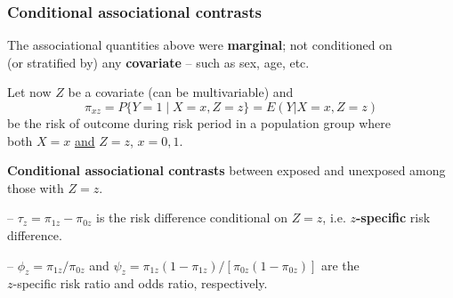\documentclass[12pt,dvipsnames,t,aspectratio=169, handout%
]{beamer}
\begin{document}
\begin{frame}
\frametitle{\large Conditional associational contrasts}

\bi
\item
The associational quantities above were \textbf{marginal}; 
not conditioned on \\ (or stratified by) any \textbf{covariate} -- such as sex, age, etc.
\pause
\medskip
\item
Let now $Z$ be a covariate (can be multivariable)  and
$$ \pi_{xz} = P\{ Y=1 \mid  X=x, Z=z \} = E(Y|X=x, Z=z) $$  
be the risk of outcome during risk period in a population group where \\
both $X=x$ \underline{and} $Z=z$, $x=0,1$.
\pause
\medskip
\item
 {\bf Conditional associational contrasts} 
between exposed and unexposed among those with $Z=z$.
\bi
{\normalsize
\item[--]
  $ \tau_z = \pi_{1z} - \pi_{0z}$ is the risk difference conditional on $Z=z$, i.e. {\bf $z$-specific} risk difference. 
\pause	
\medskip
\item[--]
$\phi_z = \pi_{1z}/\pi_{0z}$ and $\psi_z = \pi_{1z}(1-\pi_{1z})/[\pi_{0z}(1 - \pi_{0z})]$ are the  \\ $z$-specific risk ratio and odds ratio, respectively.
}
\ei

\ei 
\end{frame}
\end{document}
